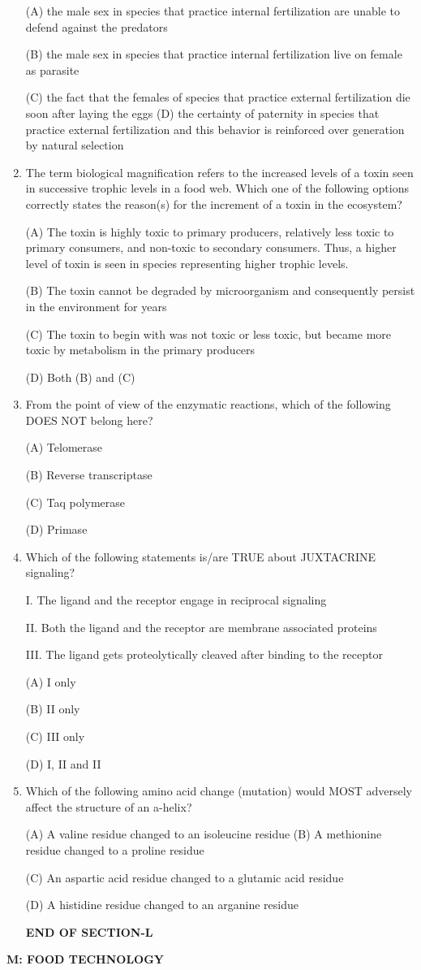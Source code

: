 \documentclass[journal]{IEEEtran}
\begin{document}
\begin{enumerate}
{(A) the male sex in species that practice internal fertilization are unable to defend against the predators

(B) the male sex in species that practice internal fertilization live on female as parasite

(C) the fact that the females of species that practice external fertilization die soon after laying the eggs
(D) the certainty of paternity in species that practice external fertilization and this behavior is reinforced over generation by natural selection
}
\item{ The term biological magnification refers to the increased levels of a toxin seen in successive trophic levels in a food web. Which one of the following options correctly states the reason(s) for the increment of a toxin in the ecosystem?

(A) The toxin is highly toxic to primary producers, relatively less toxic to primary consumers, and non-toxic to secondary consumers. Thus, a higher level of toxin is seen in species representing higher trophic levels.

(B) The toxin cannot be degraded by microorganism and consequently persist in the environment for years

(C) The toxin to begin with was not toxic or less toxic, but became more toxic by metabolism in the primary producers

(D) Both (B) and (C)
}
\item {From the point of view of the enzymatic reactions, which of the following DOES NOT belong here?

(A) Telomerase

(B) Reverse transcriptase

(C) Taq polymerase

(D) Primase
}
\item{ Which of the following statements is/are TRUE about JUXTACRINE signaling?

I. The ligand and the receptor engage in reciprocal signaling

II. Both the ligand and the receptor are membrane associated proteins

III. The ligand gets proteolytically cleaved after binding to the receptor

(A) I only

(B) II only

(C) III only

(D) I, II and II
}
\item{ Which of the following amino acid change (mutation) would MOST adversely affect the structure of an a-helix?

(A) A valine residue changed to an isoleucine residue 
(B) A methionine residue changed to a proline residue

(C) An aspartic acid residue changed to a glutamic acid residue

(D) A histidine residue changed to an arganine residue
}
\begin{center}
\textbf{END OF SECTION-L}
\end{center}
\end{enumerate}
\newpage
\textbf{M: FOOD TECHNOLOGY}
\end{document}
